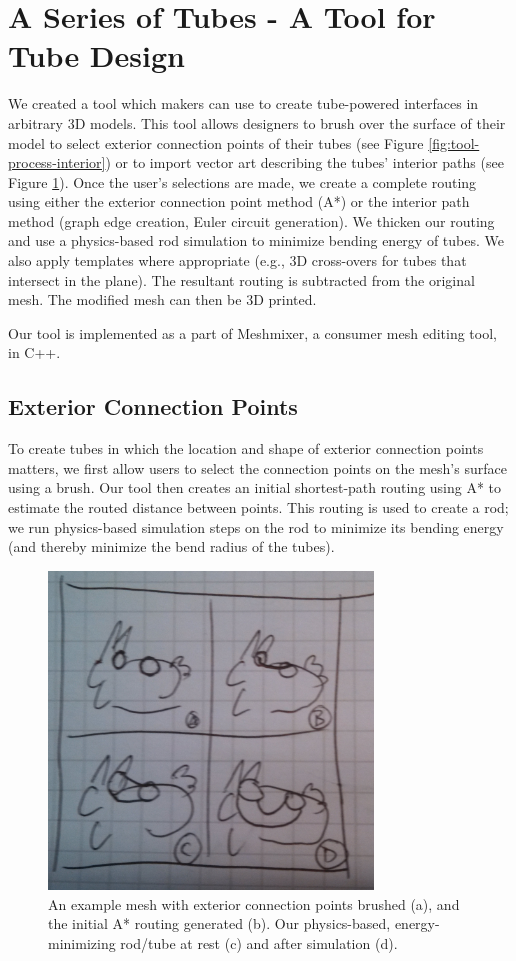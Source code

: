 \section{A Series of Tubes - A Tool for Tube Design}

We created a tool which makers can use to create tube-powered interfaces in arbitrary 3D models.  This tool allows designers to brush over the surface of their model to select exterior connection points of their tubes (see Figure \ref{fig:tool-process-interior}) or to import vector art describing the tubes' interior paths (see Figure \ref{fig:tool-process-exterior}).  Once the user's selections are made, we create a complete routing using either the exterior connection point method (A*) or the interior path method (graph edge creation, Euler circuit generation).  We thicken our routing and use a physics-based rod simulation to minimize bending energy of tubes.  We also apply templates where appropriate (e.g., 3D cross-overs for tubes that intersect in the plane).  The resultant routing is subtracted from the original mesh.  The modified mesh can then be 3D printed.

Our tool is implemented as a part of Meshmixer, a consumer mesh editing tool, in C++.

\subsection{Exterior Connection Points}

To create tubes in which the location and shape of exterior connection points matters, we first allow users to select the connection points on the mesh's surface using a brush. Our tool then creates an initial shortest-path routing using A* to estimate the routed distance between points.  This routing is used to create a rod; we run physics-based simulation steps on the rod to minimize its bending energy (and thereby minimize the bend radius of the tubes).

\begin{figure}[h!]
\centering
    \includegraphics[width=3.4in]{figures/placeholder/exterior.jpg}
\caption{An example mesh with exterior connection points brushed (a), and the initial A* routing generated (b).  Our physics-based, energy-minimizing rod/tube at rest (c) and after simulation (d).}
\label{fig:tool-process-exterior}
\end{figure}


